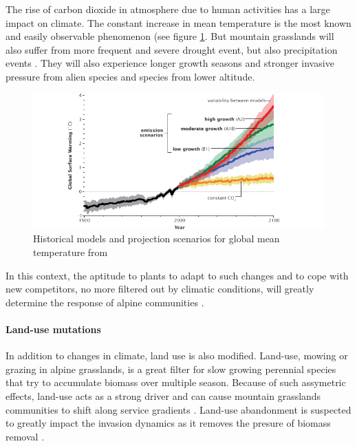 The rise of carbon dioxide in atmosphere due to human activities has a large impact on climate. The constant increase in mean temperature is the most known and easily observable phenomenon (see figure \ref{fig:climate}. But mountain grasslands will also suffer from more frequent and severe drought event, but also precipitation events \parencite{beniston_climate_1997, solomon_climate_2007, intergovernmental_panel_on_climate_change_climate_2014}. They will also experience longer growth seasons and stronger invasive pressure from alien species and species from lower altitude.


\begin{figure}
    \includegraphics[width=1\linewidth]{./1_Introduction/graphics/ipcc_scenarios.png}
  \caption[IPCC scenarios for global mean temperature]{Historical models and projection scenarios for global mean temperature from \cite{solomon_climate_2007} }
  \label{fig:climate}
\end{figure}

In this context, the aptitude to plants to adapt to such changes and to cope with new competitors, no more filtered out by climatic conditions, will greatly determine the response of alpine communities \parencite{alexander_novel_2015}.

\paragraph{Land-use mutations}

In addition to changes in climate, land use is also modified.  Land-use, mowing or grazing in alpine grasslands, is a great filter for slow growing perennial species that try to accumulate biomass over multiple season. Because of such assymetric effects, land-use acts as a strong driver and can cause mountain grasslands communities to shift along service gradients \parencite{schirpke_multiple_2012}. Land-use abandonment is suspected to greatly impact the invasion dynamics as it removes the presure of biomass removal \parencite{carboni_simulating_2017}. 

